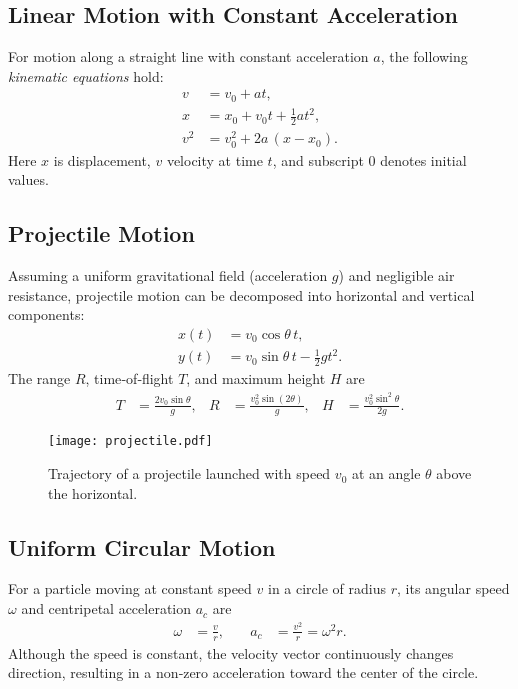 \documentclass{article}
\begin{document}
\subsection{Linear Motion with Constant Acceleration}
For motion along a straight line with constant acceleration \(a\), the following \textit{kinematic equations} hold:
\begin{align}
 v &= v_{0} + a t, \\
 x &= x_{0} + v_{0} t + \tfrac12 a t^{2}, \\
 v^{2} &= v_{0}^{2} + 2a\,(x - x_{0}).
 \label{eq:1d-const-acc}
\end{align}
Here \(x\) is displacement, \(v\) velocity at time \(t\), and subscript 0 denotes initial values.

\subsection{Projectile Motion}
Assuming a uniform gravitational field (acceleration \(g\)) and negligible air resistance, projectile motion can be decomposed into horizontal and vertical components:
\begin{align}
 x(t) &= v_{0}\cos\theta \, t, \\
 y(t) &= v_{0}\sin\theta \, t - \tfrac12 g t^{2}.
 \label{eq:projectile}
\end{align}
The range \(R\), time‑of‑flight \(T\), and maximum height \(H\) are
\begin{align}
 T &= \frac{2v_{0}\sin\theta}{g}, & R &= \frac{v_{0}^{2}\sin(2\theta)}{g}, & H &= \frac{v_{0}^{2}\sin^{2}\theta}{2g}.
\end{align}
\begin{figure}[h]
  \centering
  \texttt{[image: projectile.pdf]}
  \caption{Trajectory of a projectile launched with speed \(v_{0}\) at an angle \(\theta\) above the horizontal.}
  \label{fig:projectile}
\end{figure}

\subsection{Uniform Circular Motion}
For a particle moving at constant speed \(v\) in a circle of radius \(r\), its angular speed \(\omega\) and centripetal acceleration \(a_{c}\) are
\begin{align}
\omega &= \frac{v}{r}, & \quad a_{c} &= \frac{v^{2}}{r}=\omega^{2}r.
\end{align}
Although the speed is constant, the velocity vector continuously changes direction, resulting in a non‑zero acceleration toward the center of the circle.
\end{document}
